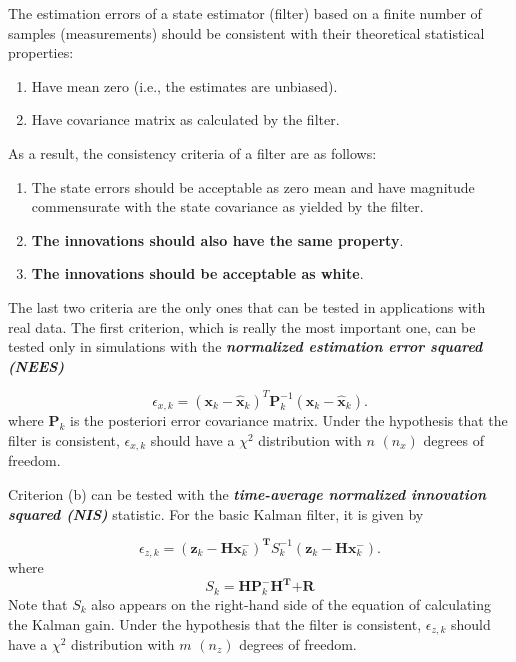 \documentclass[12pt]{article}
\begin{document}
The estimation errors of a state estimator (filter) based on a finite number of samples (measurements) should be consistent with their theoretical statistical properties: \cite{Shalom}

\begin{enumerate}
	\item Have mean zero (i.e., the estimates are unbiased).
	\item Have covariance matrix as calculated by the filter.
\end{enumerate}

As a result, the consistency criteria of a filter are as follows:

\begin{enumerate}[label=(\alph*)]
	\item The state errors should be acceptable as zero mean and have magnitude commensurate with the state covariance as yielded by the filter.
	\item \textbf{The innovations should also have the same property}.
	\item \textbf{The innovations should be acceptable as white}.
\end{enumerate}

The last two criteria are the only ones that can be tested in applications with real data. The first criterion, which is really the most important one, can be tested only in simulations with the \textbf{\textit{normalized estimation error squared (NEES)}}

\begin{equation}
	\epsilon_{x,k}=(\mathbf{x}_k - \mathbf{\hat{x}}_k)^{T}\mathbf{P}^{-1}_{k}(\mathbf{x}_k - \mathbf{\hat{x}}_k).
\end{equation}
where \(\mathbf{P}_k\) is the posteriori error covariance matrix. Under the hypothesis that the filter is consistent, \(\epsilon_{x,k}\) should have a \(\chi^2\) distribution with \(n\) \((n_x)\) degrees of freedom.

Criterion (b) can be tested with the \textbf{\textit{time-average normalized innovation squared (NIS)}} statistic. For the basic Kalman filter, it is given by

\begin{equation}
  \epsilon_{z,k}=(\mathbf{z}_{k} - \mathbf{H}\mathbf{x}_{k}^{-})^{\mathbf{T}}S_k^{- 1}(\mathbf{z}_{k} - \mathbf{H}\mathbf{x}_{k}^{-}).
\end{equation}
where
\begin{equation}
	S_k=\mathbf{H}  \mathbf{P}_{k}^{-}\mathbf{H}^{\mathbf{T}}\mathbf{+ R}
\end{equation}
Note that \(S_k\) also appears on the right-hand side of the equation of calculating the Kalman gain. Under the hypothesis that the filter is consistent, \(\epsilon_{z,k}\) should have a \(\chi^2\) distribution with \(m\) \((n_z)\) degrees of freedom.
%
\end{document}
